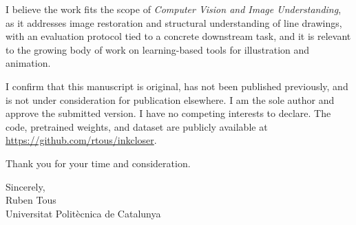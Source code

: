 \documentclass[11pt]{article}
\begin{document}
I believe the work fits the scope of \emph{Computer Vision and Image Understanding}, as
it addresses image restoration and structural understanding of line drawings, with an
evaluation protocol tied to a concrete downstream task, and it is relevant to the
growing body of work on learning-based tools for illustration and animation.

I confirm that this manuscript is original, has not been published previously, and is
not under consideration for publication elsewhere. I am the sole author and approve the
submitted version. I have no competing interests to declare. The code, pretrained
weights, and dataset are publicly available at
\url{https://github.com/rtous/inkcloser}.

Thank you for your time and consideration.

Sincerely,\\[1.2em]
Ruben Tous\\
Universitat Polit\`ecnica de Catalunya
\end{document}
